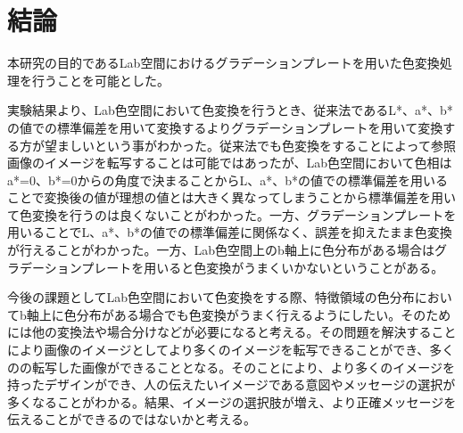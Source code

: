 \chapter{結論}
本研究の目的であるLab空間におけるグラデーションプレートを用いた色変換処理を行うことを可能とした。\par
実験結果より、Lab色空間において色変換を行うとき、従来法であるL*、a*、b*の値での標準偏差を用いて変換するよりグラデーションプレートを用いて変換する方が望ましいという事がわかった。従来法でも色変換をすることによって参照画像のイメージを転写することは可能ではあったが、Lab色空間において色相はa*=0、b*=0からの角度で決まることからL、a*、b*の値での標準偏差を用いることで変換後の値が理想の値とは大きく異なってしまうことから標準偏差を用いて色変換を行うのは良くないことがわかった。一方、グラデーションプレートを用いることでL、a*、b*の値での標準偏差に関係なく、誤差を抑えたまま色変換が行えることがわかった。一方、Lab色空間上のb軸上に色分布がある場合はグラデーションプレートを用いると色変換がうまくいかないということがある。\par
今後の課題としてLab色空間において色変換をする際、特徴領域の色分布においてb軸上に色分布がある場合でも色変換がうまく行えるようにしたい。そのためには他の変換法や場合分けなどが必要になると考える。その問題を解決することにより画像のイメージとしてより多くのイメージを転写できることができ、多くのの転写した画像ができることとなる。そのことにより、より多くのイメージを持ったデザインができ、人の伝えたいイメージである意図やメッセージの選択が多くなることがわかる。結果、イメージの選択肢が増え、より正確メッセージを伝えることができるのではないかと考える。
